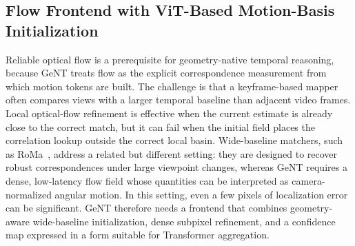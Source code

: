 \subsection{Flow Frontend with ViT-Based Motion-Basis Initialization}
Reliable optical flow is a prerequisite for geometry-native temporal reasoning, because GeNT treats flow as the explicit correspondence measurement from which motion tokens are built.
The challenge is that a keyframe-based mapper often compares views with a larger temporal baseline than adjacent video frames.
Local optical-flow refinement is effective when the current estimate is already close to the correct match, but it can fail when the initial field places the correlation lookup outside the correct local basin.
Wide-baseline matchers, such as RoMa~\cite{edstedt2024roma}, address a related but different setting: they are designed to recover robust correspondences under large viewpoint changes, whereas GeNT requires a dense, low-latency flow field whose quantities can be interpreted as camera-normalized angular motion.
In this setting, even a few pixels of localization error can be significant.
GeNT therefore needs a frontend that combines geometry-aware wide-baseline initialization, dense subpixel refinement, and a confidence map expressed in a form suitable for Transformer aggregation.

